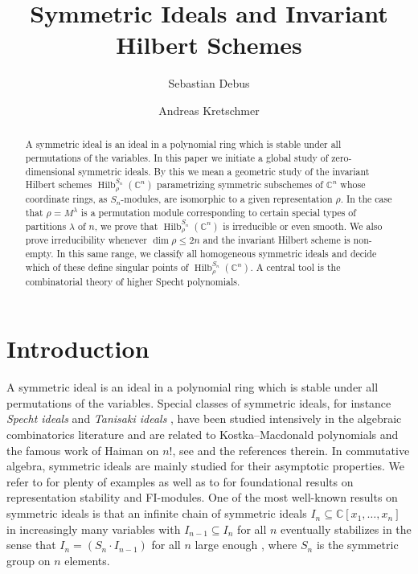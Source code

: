 \documentclass[11pt]{amsart}
\theoremstyle{definition}
\newcommand{\CC}{\mathbb{C}}
\DeclareMathOperator{\Hilb}{Hilb}
\begin{document}
\nocite*{}
\title{Symmetric Ideals and Invariant Hilbert Schemes}

\author{Sebastian Debus}
\author{Andreas Kretschmer}

\begin{abstract}
A symmetric ideal is an ideal in a polynomial ring which is stable under all permutations of the variables. In this paper we initiate a global study of zero-dimensional symmetric ideals. By this we mean a geometric study of the invariant Hilbert schemes $\Hilb_{\rho}^{S_n}(\CC^n)$ parametrizing symmetric subschemes of $\CC^n$ whose coordinate rings, as $S_n$-modules, are isomorphic to a given representation $\rho$. In the case that $\rho = M^\lambda$ is a permutation module corresponding to certain special types of partitions $\lambda$ of $n$, we prove that $\Hilb_{\rho}^{S_n}(\CC^n)$ is irreducible or even smooth. We also prove irreducibility whenever $\dim \rho \leq 2n$ and the invariant Hilbert scheme is non-empty. In this same range, we classify all homogeneous symmetric ideals and decide which of these define singular points of $\Hilb_{\rho}^{S_n}(\CC^n)$. A central tool is the combinatorial theory of higher Specht polynomials. 
\end{abstract}

\maketitle


\section{Introduction}

A symmetric ideal is an ideal in a polynomial ring which is stable under all permutations of the variables.
Special classes of symmetric ideals, for instance \emph{Specht ideals} and \emph{Tanisaki ideals} \cite{Tanisaki1982Defining,BergeronGarsia1992Harmonic,GarsiaProcesi1992}, have been studied intensively in the algebraic combinatorics literature and are related to Kostka--Macdonald polynomials and the famous work of Haiman on $n!$, see \cite{Haiman2003Combinatorics} and the references therein.
In commutative algebra, symmetric ideals are mainly studied for their asymptotic properties. We refer to \cite{Nagel2017Equivariant,Nagel2019FIvaryingCoeff,NagelRoemer2020CodimUpToSymmetry,NagelRoemer2021RegularityUpToSymmetry,nagpal2021symmetric} for plenty of examples as well as to \cite{ChurchFarb2013RepresentationStability,ChurchEllenbergFarb2015FImodules} for foundational results on representation stability and FI-modules. One of the most well-known results on symmetric ideals is that an infinite chain of symmetric ideals $I_n \subseteq \CC[x_1,\ldots,x_n]$ in increasingly many variables with $I_{n-1} \subseteq I_n$ for all $n$ eventually stabilizes in the sense that $I_n = (S_n \cdot I_{n-1})$ for all $n$ large enough \cite{Cohen1967Laws,Aschenbrenner2007Finite,Hillar2012Finite,Draisma2014Noetherianity}, where $S_n$ is the symmetric group on $n$ elements.
\end{document}
